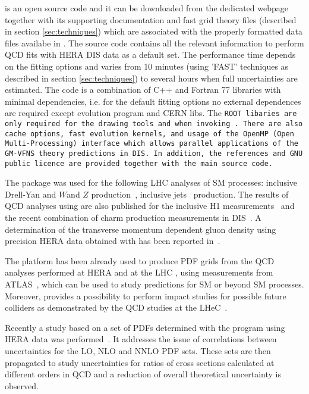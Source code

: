 
\fitter is an open source code and it can be downloaded from the dedicated webpage \cite{herafitter:page}
together with its supporting documentation and 
fast grid theory files (described in section \ref{sec:techniques}) which are associated with the properly formatted data files availabe in \fitter.
The source code contains all the relevant information to perform QCD fits with HERA DIS data as a default set. The performance time depends on the fitting options and varies from 10 minutes 
(using 'FAST' techniques as described in section \ref{sec:techniques}) to several hours when full uncertainties are estimated. The \fitter code is a combination of C++ and Fortran 77 libraries with minimal 
dependencies, i.e. for the default fitting options no external dependences are required  except \qcdnum evolution program \cite{qcdnum} and CERN libs. The \tt ROOT \rm  libaries are only required for the drawing tools and when invoking \applgrid\rm.  
There are also cache options, fast evolution kernels, and usage of the OpenMP (Open Multi-Processing)  interface which allows parallel applications of the GM-VFNS theory predictions in DIS. 
In addition, the \fitter references and GNU public licence are provided 
together with the main source code. 


The \fitter package was used for the following LHC analyses of SM processes:
inclusive Drell-Yan and $W$and $Z$ 
production~\cite{atlas:strange,atlas:hm,cms:strange},
inclusive jets~\cite{atlas:jets} production.
The results of QCD analyses using \fitter are also
published for the inclusive H1 measurements~\cite{h1:2012kk}
and the recent combination of charm production measurements 
in DIS~\cite{h1zeus:charm}.
A determination of the transverse momentum dependent gluon density using precision HERA data obtained with \fitter has been reported in~\cite{Jung2014}. 


The \fitter platform has been already used to produce PDF grids 
from the QCD analyses performed at 
HERA \cite{h1zeus:2009wt,hera:grids} and at the LHC \cite{atlas:grids}, using 
measurements from ATLAS~\cite{atlas:strange,atlas:jets}, which can be used to study predictions for SM or beyond SM processes.  Moreover, \fitter provides a possibility to 
perform impact studies for possible future colliders
as demonstrated by the QCD studies at the LHeC~\cite{lhec:studies}.

Recently a study based on a set of PDFs 
determined with the \fitter program using HERA data was performed~\cite{hfcorrpaper}. It addresses the issue of correlations between uncertainties for the LO,
NLO and NNLO PDF sets. These sets are then propagated to study uncertainties 
for ratios of cross sections calculated at different orders in QCD and  
a reduction of overall theoretical uncertainty is observed.







